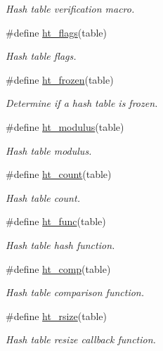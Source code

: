 \begin{CompactItemize}
\begin{CompactList}\small\item\em Hash table verification macro. \item\end{CompactList}\item 
\#define \hyperlink{group__dbprim__hash_ga28}{ht\_\-flags}(table)
\begin{CompactList}\small\item\em Hash table flags. \item\end{CompactList}\item 
\#define \hyperlink{group__dbprim__hash_ga29}{ht\_\-frozen}(table)
\begin{CompactList}\small\item\em Determine if a hash table is frozen. \item\end{CompactList}\item 
\#define \hyperlink{group__dbprim__hash_ga30}{ht\_\-modulus}(table)
\begin{CompactList}\small\item\em Hash table modulus. \item\end{CompactList}\item 
\#define \hyperlink{group__dbprim__hash_ga31}{ht\_\-count}(table)
\begin{CompactList}\small\item\em Hash table count. \item\end{CompactList}\item 
\#define \hyperlink{group__dbprim__hash_ga32}{ht\_\-func}(table)
\begin{CompactList}\small\item\em Hash table hash function. \item\end{CompactList}\item 
\#define \hyperlink{group__dbprim__hash_ga33}{ht\_\-comp}(table)
\begin{CompactList}\small\item\em Hash table comparison function. \item\end{CompactList}\item 
\#define \hyperlink{group__dbprim__hash_ga34}{ht\_\-rsize}(table)
\begin{CompactList}\small\item\em Hash table resize callback function. \item\end{CompactList}\item 

\end{CompactItemize}
